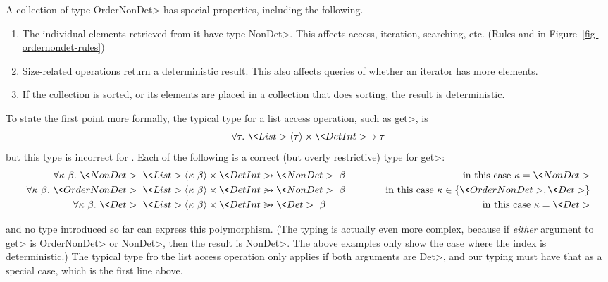 A collection of type \<OrderNonDet> has special properties, including the following.

\begin{enumerate}
\item
The individual elements retrieved from it have type \<NonDet>.  This
affects access, iteration, searching, etc.
(Rules  and  in Figure~\ref{fig-ordernondet-rules})
\item
Size-related operations return a deterministic result.  This also affects
queries of whether an iterator has more elements.
\item
If the collection is sorted, or its elements are placed in a collection
that does sorting, the result is deterministic.
\end{enumerate}

To state the first point more formally, the 
typical type for a list access operation, such as \<get>, is
$$\forallt{\tau} \<List>\angles{\tau} \times \<Det Int> \rightarrow \tau$$
but this type is incorrect for \ourTypeSystem.  Each of the following is a
correct (but overly restrictive) type for \<get>:
\begin{eqnarray*}
\forallt{\kappa\ \beta} \<NonDet>\ \<List>\angles{\kappa\ \beta} \times \<Det Int>
& \strut\hspace{-1em} \rightarrow \<NonDet>\ \beta
& \mbox{\quad in this case $\kappa = \<NonDet>$} \\
\forallt{\kappa\ \beta} \<OrderNonDet>\ \<List>\angles{\kappa\ \beta} \times \<Det Int>
& \strut\hspace{-1em} \rightarrow \<NonDet>\ \beta
& \mbox{\quad in this case $\kappa \in \{ \<OrderNonDet>, \<Det> \} $} \\
\forallt{\kappa\ \beta} \<Det>\ \<List>\angles{\kappa\ \beta} \times \<Det Int>
& \strut\hspace{-1em} \rightarrow \<Det>\ \beta\phantom{\<Non>}
& \mbox{\quad in this case $\kappa = \<Det>$}
\end{eqnarray*}

\noindent
and no type introduced so far can express this polymorphism.
(The typing is actually even more complex, because if \emph{either}
argument to \<get> is \<OrderNonDet> or \<NonDet>, then the
result is \<NonDet>.  The above examples only show the case where the index
is deterministic.)
The typical type fro the list access operation only applies if both
arguments are \<Det>,
and our typing must have that as a special case, which is the first line above.






